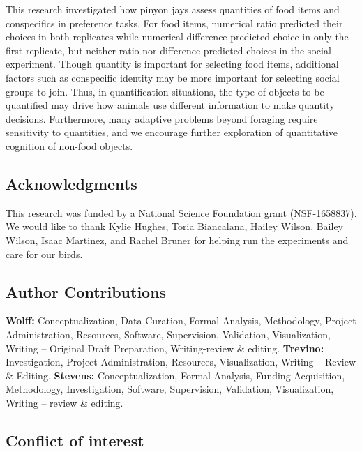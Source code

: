 \documentclass[
  ,pub,floatsintext]{apa6}
\begin{document}
This research investigated how pinyon jays assess quantities of food items and conspecifics in preference tasks. For food items, numerical ratio predicted their choices in both replicates while numerical difference predicted choice in only the first replicate, but neither ratio nor difference predicted choices in the social experiment. Though quantity is important for selecting food items, additional factors such as conspecific identity may be more important for selecting social groups to join. Thus, in quantification situations, the type of objects to be quantified may drive how animals use different information to make quantity decisions. Furthermore, many adaptive problems beyond foraging require sensitivity to quantities, and we encourage further exploration of quantitative cognition of non-food objects.

\hypertarget{acknowledgments}{%
\subsection{Acknowledgments}\label{acknowledgments}}

This research was funded by a National Science Foundation grant (NSF-1658837). We would like to thank Kylie Hughes, Toria Biancalana, Hailey Wilson, Bailey Wilson, Isaac Martinez, and Rachel Bruner for helping run the experiments and care for our birds.

\hypertarget{author-contributions}{%
\subsection{Author Contributions}\label{author-contributions}}

\textbf{Wolff:} Conceptualization, Data Curation, Formal Analysis, Methodology, Project Administration, Resources, Software, Supervision, Validation, Visualization, Writing -- Original Draft Preparation, Writing-review \& editing. \textbf{Trevino:} Investigation, Project Administration, Resources, Visualization, Writing -- Review \& Editing. \textbf{Stevens:} Conceptualization, Formal Analysis, Funding Acquisition, Methodology, Investigation, Software, Supervision, Validation, Visualization, Writing -- review \& editing.

\hypertarget{conflict-of-interest}{%
\subsection{Conflict of interest}\label{conflict-of-interest}}
\end{document}
